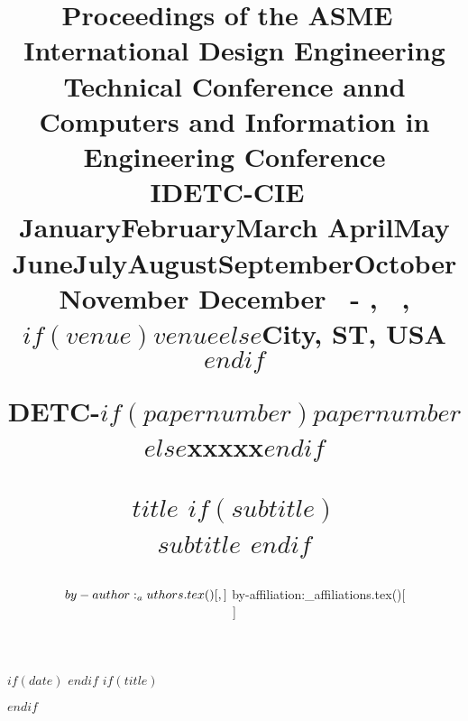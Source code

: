 \usepackage{advdate}
$if(date)$
\SetDate[$date$]
\FixDate
$endif$
\newcommand{\daterange}{
  \ifcase \the\month \or January\or February\or March\or %
    April\or May \or June\or July\or August\or September\or October\or November\or %
    December
  \fi
  ~\the\day -\AdvanceDate[3]\the\day
  ,~\the\year
}
$if(title)$
\title{
  \bfseries\sffamily\normalsize
  \begin{flushright}
    \vspace*{-2\baselineskip}
    {\fontsize{11pt}{12pt}\selectfont Proceedings of the ASME~\the\year\\International Design Engineering Technical Conference annd\\
      Computers and Information in Engineering Conference\\
      IDETC-CIE~\the\year\\
      \daterange, $if(venue)$$venue$$else$City, ST, USA$endif$\\}

    \vspace*{2\baselineskip}
    {\LARGE DETC\the\year -$if(papernumber)$$papernumber$$else$xxxxx$endif$}\\
    \vspace*{2.5\baselineskip}
  \end{flushright}
  \large\MakeUppercase{$title$}
  $if(subtitle)$
  \\\vspace*{\baselineskip}
  \normalsize\MakeUppercase{$subtitle$}
  $endif$
}
$endif$

\author{${  by-author:_authors.tex()[, ] }\vspace{\baselineskip}\\ ${  by-affiliation:_affiliations.tex()[\\ ] }}

\date{ }